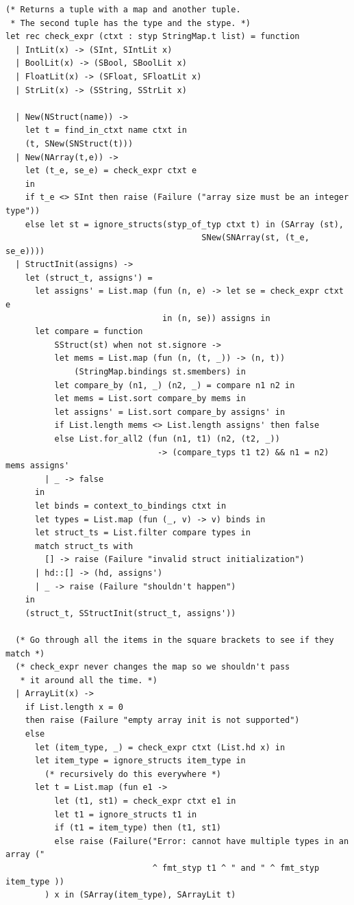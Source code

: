\documentclass[12pt]{article}
\begin{document}
\begin{mdframed}[hidealllines=true,backgroundcolor=blue!20]
\begin{lstlisting}
(* Returns a tuple with a map and another tuple.
 * The second tuple has the type and the stype. *)
let rec check_expr (ctxt : styp StringMap.t list) = function
  | IntLit(x) -> (SInt, SIntLit x)
  | BoolLit(x) -> (SBool, SBoolLit x)
  | FloatLit(x) -> (SFloat, SFloatLit x)
  | StrLit(x) -> (SString, SStrLit x)

  | New(NStruct(name)) ->
    let t = find_in_ctxt name ctxt in
    (t, SNew(SNStruct(t)))
  | New(NArray(t,e)) ->
    let (t_e, se_e) = check_expr ctxt e 
    in
    if t_e <> SInt then raise (Failure ("array size must be an integer type"))
    else let st = ignore_structs(styp_of_typ ctxt t) in (SArray (st), 
                                        SNew(SNArray(st, (t_e, se_e))))
  | StructInit(assigns) -> 
    let (struct_t, assigns') = 
      let assigns' = List.map (fun (n, e) -> let se = check_expr ctxt e 
                                in (n, se)) assigns in
      let compare = function
          SStruct(st) when not st.signore ->
          let mems = List.map (fun (n, (t, _)) -> (n, t)) 
              (StringMap.bindings st.smembers) in
          let compare_by (n1, _) (n2, _) = compare n1 n2 in
          let mems = List.sort compare_by mems in
          let assigns' = List.sort compare_by assigns' in
          if List.length mems <> List.length assigns' then false
          else List.for_all2 (fun (n1, t1) (n2, (t2, _)) 
                               -> (compare_typs t1 t2) && n1 = n2) mems assigns'
        | _ -> false
      in
      let binds = context_to_bindings ctxt in
      let types = List.map (fun (_, v) -> v) binds in
      let struct_ts = List.filter compare types in
      match struct_ts with
        [] -> raise (Failure "invalid struct initialization")
      | hd::[] -> (hd, assigns')
      | _ -> raise (Failure "shouldn't happen")
    in
    (struct_t, SStructInit(struct_t, assigns'))

  (* Go through all the items in the square brackets to see if they match *)
  (* check_expr never changes the map so we shouldn't pass
   * it around all the time. *) 
  | ArrayLit(x) -> 
    if List.length x = 0
    then raise (Failure "empty array init is not supported")
    else 
      let (item_type, _) = check_expr ctxt (List.hd x) in
      let item_type = ignore_structs item_type in 
        (* recursively do this everywhere *)
      let t = List.map (fun e1 ->
          let (t1, st1) = check_expr ctxt e1 in
          let t1 = ignore_structs t1 in
          if (t1 = item_type) then (t1, st1)
          else raise (Failure("Error: cannot have multiple types in an array ("
                              ^ fmt_styp t1 ^ " and " ^ fmt_styp item_type ))
        ) x in (SArray(item_type), SArrayLit t)
  

\end{lstlisting}
\end{mdframed}
\end{document}
